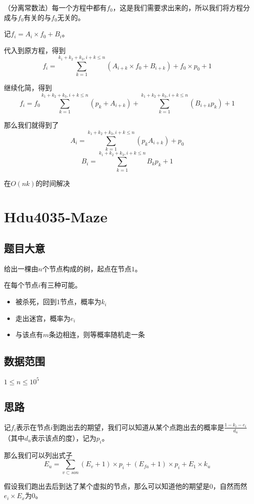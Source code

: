 \documentclass{ctexart}
\numberwithin{equation}{section}
\begin{document}
\begin{flushleft}
  （分离常数法）每一个方程中都有$f_0$，这是我们需要求出来的，所以我们将方程分成与$f_0$有关的与$f_0$无关的。

  记$f_i=A_i\times f_0+B_i$。

  代入到原方程，得到$$f_i=\sum_{k=1}^{k_1+k_2+k_3,i+k\le n}(A_{i+k}\times f_0+B_{i+k})+f_0\times p_0+1$$

  继续化简，得到$$f_i=f_{0}\sum_{k=1}^{k_1+k_2+k_3,i+k\le n}(p_k+A_{i+k})+\sum_{k=1}^{k_1+k_2+k_3,i+k\le n}(B_{i+k}p_k)+1$$

  那么我们就得到了$$A_i=\sum_{k=1}^{k_1+k_2+k_3,i+k\le n}(p_kA_{i+k})+p_0$$
  $$B_i=\sum_{k=1}^{k_1+k_2+k_3,i+k\le n}B_kp_k+1$$
  
  在$O(nk)$的时间解决
  
  \newpage

  \section{Hdu4035-Maze}
  \subsection{题目大意}
  给出一棵由$n$个节点构成的树，起点在节点$1$。

  在每个节点$i$有三种可能。
  \begin{itemize}
  \item 被杀死，回到$1$节点，概率为$k_i$
  \item 走出迷宫，概率为$e_i$
  \item 与该点有$m$条边相连，则等概率随机走一条
  \end{itemize}
    

  \subsection{数据范围}
  $1\le n \le 10^5$
  \subsection{思路}
  记$f_i$表示在节点$i$到跑出去的期望，我们可以知道从某个点跑出去的概率是$\frac{1-k_i-e_i}{d_u}$（其中$d_u$表示该点的度），记为$p_i$。

  那么我们可以列出式子$$E_u=\sum_{v \subset son}(E_v+1)\times p_i+(E_{fa}+1)\times p_i+E_1\times k_u$$

  假设我们跑出去后到达了某个虚拟的节点，那么可以知道他的期望是$0$，自然而然$e_i\times E_x$为$0$。
  

\end{flushleft}
\end{document}
